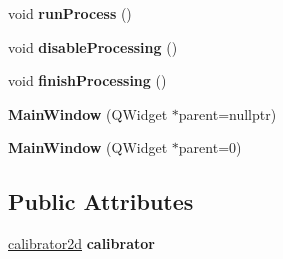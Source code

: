 \begin{DoxyCompactItemize}
\item 
void {\bfseries run\+Process} ()\hypertarget{classMainWindow_a468abd7d3bb11e93016dc02f9f8a3d5a}{}\label{classMainWindow_a468abd7d3bb11e93016dc02f9f8a3d5a}

\item 
void {\bfseries disable\+Processing} ()\hypertarget{classMainWindow_ab79016e1c28ee0b2e9e30ad24bbe5c90}{}\label{classMainWindow_ab79016e1c28ee0b2e9e30ad24bbe5c90}

\item 
void {\bfseries finish\+Processing} ()\hypertarget{classMainWindow_a3ef0357cabe8d15fa799b8355f22379f}{}\label{classMainWindow_a3ef0357cabe8d15fa799b8355f22379f}

\item 
{\bfseries Main\+Window} (Q\+Widget $\ast$parent=nullptr)\hypertarget{classMainWindow_a996c5a2b6f77944776856f08ec30858d}{}\label{classMainWindow_a996c5a2b6f77944776856f08ec30858d}

\item 
{\bfseries Main\+Window} (Q\+Widget $\ast$parent=0)\hypertarget{classMainWindow_a8b244be8b7b7db1b08de2a2acb9409db}{}\label{classMainWindow_a8b244be8b7b7db1b08de2a2acb9409db}

\end{DoxyCompactItemize}
\subsection*{Public Attributes}
\begin{DoxyCompactItemize}
\item 
\hyperlink{classcalibrator2d}{calibrator2d} {\bfseries calibrator}\hypertarget{classMainWindow_a68187b8612ef897ac71aa165e0298f5f}{}\label{classMainWindow_a68187b8612ef897ac71aa165e0298f5f}

\end{DoxyCompactItemize}
